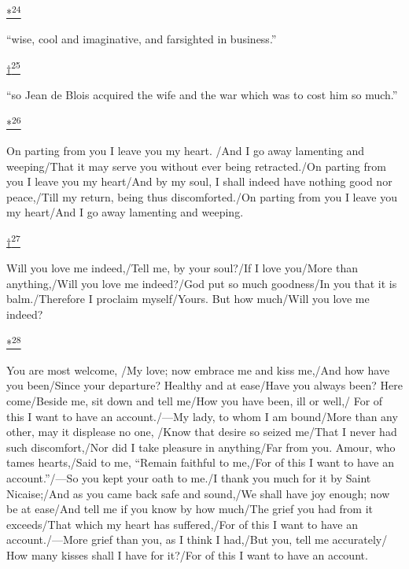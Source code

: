 \protect\hypertarget{23_NOTES.xhtmlux5cux23id_2742}{\protect\hyperlink{21_Chapter_Thirteen__IMAGE_AND_WORD.xhtmlux5cux23id_2741}{*\textsuperscript{24}}}
``wise, cool and imaginative, and farsighted in business.''

\protect\hypertarget{23_NOTES.xhtmlux5cux23id_2744}{\protect\hyperlink{21_Chapter_Thirteen__IMAGE_AND_WORD.xhtmlux5cux23id_2743}{†\textsuperscript{25}}}
``so Jean de Blois acquired the wife and the war which was to cost him
so much.''

\protect\hypertarget{23_NOTES.xhtmlux5cux23id_2746}{\protect\hyperlink{21_Chapter_Thirteen__IMAGE_AND_WORD.xhtmlux5cux23id_2745}{*\textsuperscript{26}}}
On parting from you I leave you my heart. /And I go away lamenting and
weeping/That it may serve you without ever being retracted./On parting
from you I leave you my heart/And by my soul, I shall indeed have
nothing good nor peace,/Till my return, being thus discomforted./On
parting from you I leave you my heart/And I go away lamenting and
weeping.

\protect\hypertarget{23_NOTES.xhtmlux5cux23id_2748}{\protect\hyperlink{21_Chapter_Thirteen__IMAGE_AND_WORD.xhtmlux5cux23id_2747}{†\textsuperscript{27}}}
Will you love me indeed,/Tell me, by your soul?/If I love you/More than
anything,/Will you love me indeed?/God put so much goodness/In you that
it is balm./Therefore I proclaim myself/Yours. But how much/Will you
love me indeed?

\protect\hypertarget{23_NOTES.xhtmlux5cux23id_2750}{\protect\hyperlink{21_Chapter_Thirteen__IMAGE_AND_WORD.xhtmlux5cux23id_2749}{*\textsuperscript{28}}}
You are most welcome, /My love; now embrace me and kiss me,/And how have
you been/Since your departure? Healthy and at ease/Have you always been?
Here come/Beside me, sit down and tell me/How you have been, ill or
well,/ For of this I want to have an account./---My lady, to whom I am
bound/More than any other, may it displease no one, /Know that desire so
seized me/That I never had such discomfort,/Nor did I take pleasure in
anything/Far from you. Amour, who tames hearts,/Said to me, ``Remain
faithful to me,/For of this I want to have an account.''/---So you kept
your oath to me./I thank you much for it by Saint Nicaise;/And as you
came back safe and sound,/We shall have joy enough; now be at ease/And
tell me if you know by how much/The grief you had from it exceeds/That
which my heart has suffered,/For of this I want to have an
account./---More grief than you, as I think I had,/But you, tell me
accurately/ How many kisses shall I have for it?/For of this I want to
have an account.

